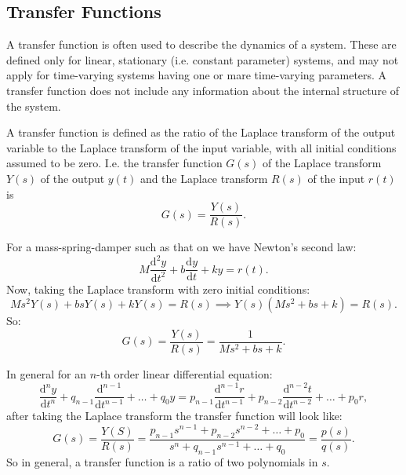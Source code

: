 \subsection{Transfer Functions}
A transfer function is often used to describe the dynamics of a system.
These are defined only for linear, stationary (i.e. constant parameter) systems, and may not apply for time-varying systems having one or mare time-varying parameters.
A transfer function does not include any information about the internal structure of the system.
\begin{definition}
  A transfer function is defined as the ratio of the Laplace transform of the output variable to the Laplace transform of the input variable, with all initial conditions assumed to be zero.
  I.e. the transfer function $G(s)$ of the Laplace transform $Y(s)$ of the output $y(t)$ and the Laplace transform $R(s)$ of the input $r(t)$ is
  \begin{equation*}
    G(s) = \frac{Y(s)}{R(s)}
  .\end{equation*}
\end{definition}

\begin{exa}
  For a mass-spring-damper such as that on  we have Newton's second law:
  \begin{equation*}
    M \frac{\mathrm{d}^2 y}{\mathrm{d}t^2} + b \frac{\mathrm{d}y}{\mathrm{d}t} + ky = r(t) 
  .\end{equation*}
  Now, taking the Laplace transform with zero initial conditions:
  \begin{equation*}
    M s^2 Y(s) + bs Y(s) + kY(s) = R(s) \implies Y(s) \left( Ms^2 + bs + k \right) = R(s)
  .\end{equation*}
  So:
  \begin{equation*}
    G(s) = \frac{Y(s)}{R(s)} = \frac{1}{Ms^2 + bs + k}
  .\end{equation*}
\end{exa}

In general for an $n$-th order linear differential equation:
\begin{equation*}
  \frac{\mathrm{d}^{n}y}{\mathrm{d}t^{n}} + q_{n-1} \frac{\mathrm{d}^{n-1}}{\mathrm{d}t ^{n-1}} + \ldots + q_0 y = p_{n-1} \frac{\mathrm{d}^{n-1}r}{\mathrm{d}t ^{n-1}} + p_{n-2} \frac{\mathrm{d}^{n-2} t}{\mathrm{d}t ^{n-2}} + \ldots + p_0 r 
,\end{equation*}
after taking the Laplace transform the transfer function will look like:
\begin{equation*}
  G(s) = \frac{Y(S)}{R(s)} = \frac{p_{n-1} s^{n-1} + p_{n-2} s^{n-2} + \ldots + p_0}{s^{n} + q_{n-1} s^{n-1} + \ldots + q_0} = \frac{p(s)}{q(s)}
.\end{equation*}
So in general, a transfer function is a ratio of two polynomials in $s$.

